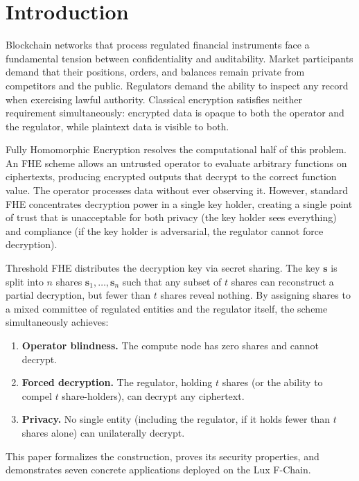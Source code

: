 \section{Introduction}

\label{sec:intro}

Blockchain networks that process regulated financial instruments face a
fundamental tension between confidentiality and auditability.  Market
participants demand that their positions, orders, and balances remain
private from competitors and the public.  Regulators demand the ability
to inspect any record when exercising lawful authority.  Classical
encryption satisfies neither requirement simultaneously: encrypted data
is opaque to both the operator and the regulator, while plaintext data
is visible to both.

Fully Homomorphic Encryption resolves the computational half of this
problem.  An FHE scheme allows an untrusted operator to evaluate
arbitrary functions on ciphertexts, producing encrypted outputs that
decrypt to the correct function value.  The operator processes data
without ever observing it.  However, standard FHE concentrates
decryption power in a single key holder, creating a single point of
trust that is unacceptable for both privacy (the key holder sees
everything) and compliance (if the key holder is adversarial, the
regulator cannot force decryption).

Threshold FHE distributes the decryption key via secret sharing.  The
key $\mathbf{s}$ is split into $n$ shares $\mathbf{s}_1, \ldots,
\mathbf{s}_n$ such that any subset of $t$ shares can reconstruct a
partial decryption, but fewer than $t$ shares reveal nothing.  By
assigning shares to a mixed committee of regulated entities and the
regulator itself, the scheme simultaneously achieves:

\begin{enumerate}[nosep]
  \item \textbf{Operator blindness.}  The compute node has zero shares
        and cannot decrypt.
  \item \textbf{Forced decryption.}  The regulator, holding $t$ shares
        (or the ability to compel $t$ share-holders), can decrypt any
        ciphertext.
  \item \textbf{Privacy.}  No single entity (including the regulator,
        if it holds fewer than $t$ shares alone) can unilaterally decrypt.
\end{enumerate}

This paper formalizes the construction, proves its security properties,
and demonstrates seven concrete applications deployed on the Lux
F-Chain.

